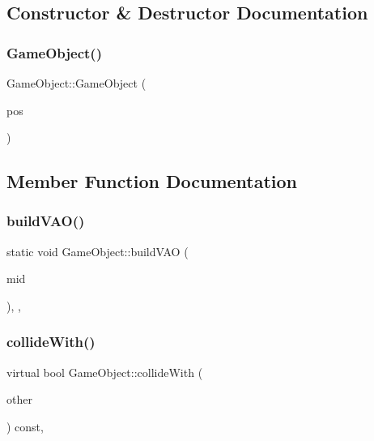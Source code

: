 \subsection{Constructor \& Destructor Documentation}
\mbox{\label{class_game_object_ac95c474744d79fe4aadc49a100cfb9c6}} 
\subsubsection{\texorpdfstring{Game\+Object()}{GameObject()}}
{\footnotesize\ttfamily Game\+Object\+::\+Game\+Object (\begin{DoxyParamCaption}\item[{\hyperlink{class_vector3}{Vector3}}]{pos }\end{DoxyParamCaption})\hspace{0.3cm}{\ttfamily [inline]}}



\subsection{Member Function Documentation}
\mbox{\label{class_game_object_a9fc6cfc23e66aeb60bc6d3eb8ac0c351}} 
\subsubsection{\texorpdfstring{build\+V\+A\+O()}{buildVAO()}}
{\footnotesize\ttfamily static void Game\+Object\+::build\+V\+AO (\begin{DoxyParamCaption}\item[{G\+Lint}]{mid }\end{DoxyParamCaption})\hspace{0.3cm}{\ttfamily [inline]}, {\ttfamily [static]}, {\ttfamily [protected]}}

\mbox{\label{class_game_object_a9ab7d2e2beff3e91ccdc87c9fbca019e}} 
\subsubsection{\texorpdfstring{collide\+With()}{collideWith()}}
{\footnotesize\ttfamily virtual bool Game\+Object\+::collide\+With (\begin{DoxyParamCaption}\item[{const \hyperlink{class_game_object}{Game\+Object} $\ast$}]{other }\end{DoxyParamCaption}) const\hspace{0.3cm}{\ttfamily [inline]}, {\ttfamily [virtual]}}



